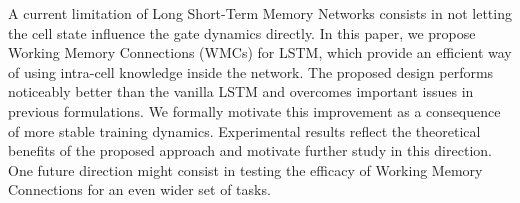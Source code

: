 A current limitation of Long Short-Term Memory Networks consists in not letting the cell state influence the gate dynamics directly. In this paper, we propose Working Memory Connections (WMCs) for LSTM, which provide an efficient way of using intra-cell knowledge inside the network. The proposed design performs noticeably better than the vanilla LSTM and overcomes important issues in previous formulations. We formally motivate this improvement as a consequence of more stable training dynamics. Experimental results reflect the theoretical benefits of the proposed approach and motivate further study in this direction. One future direction might consist in testing the efficacy of Working Memory Connections for an even wider set of tasks.
